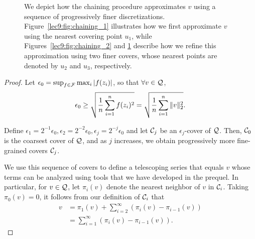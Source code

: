 \begin{figure}[ht!]
\begin{subfigure}[t]{0.45\textwidth}
        \caption{}
        \label{lec9:fig:chaining_3}
    \end{subfigure}
    \caption{We depict how the chaining procedure approximates $v$ using a sequence of progressively finer discretizations. Figure~\ref{lec9:fig:chaining_1} illustrates how we first approximate $v$ using the nearest covering point $u_1$, while Figures~\ref{lec9:fig:chaining_2} and \ref{lec9:fig:chaining_3} describe how we refine this approximation using two finer covers, whose nearest points are denoted by $u_2$ and $u_3$, respectively.}
    \label{lec9:fig:chaining_diag}
\end{figure}

\begin{proof} 
    Let $\epsilon_0 = \sup_{f\in \mathcal F} \max_i \left\lvert f(z_i)\right\rvert$, so that $\forall v \in \mathcal Q$,
    \begin{equation}
        \epsilon_0 \ge \sqrt{\frac 1 n \sum_{i=1}^nf(z_i)^2}  = \sqrt{\frac 1 n \sum_{i=1}^n \|v\|_2^2}.
    \end{equation}
    
    Define $\epsilon_1 = 2^{-1}\epsilon_0, \epsilon_2 = 2^{-2}\epsilon_0, \epsilon_j = 2^{-j}\epsilon_0$ and let $\mathcal C_j$ be an $\epsilon_j$-cover of $\mathcal Q$. Then, $\mathcal C_0$ is the coarsest cover of $\mathcal Q$, and as $j$ increases, we obtain progressively more fine-grained covers $\mathcal C_j$.
    
    We use this sequence of covers to define a telescoping series that equals $v$ whose terms can be analyzed using tools that we have developed in the prequel. In particular, for $v \in \mathcal Q$, let $\pi_i(v)$ denote the nearest neighbor of $v$ in $\mathcal C_i$. Taking $\pi_0(v) = 0$, it follows from our definition of $\mathcal C_i$ that
    \begin{align}
        v &= \pi_1(v) + \sum_{i = 2}^\infty (\pi_i(v) - \pi_{i - 1}(v)) \\
        &= \sum_{i = 1}^\infty (\pi_i(v) - \pi_{i - 1}(v)).
    \end{align}
    

\end{proof}
